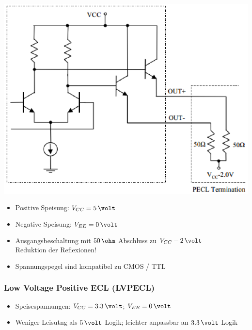 \begin{minipage}[c]{0.25\columnwidth}
    \includegraphics[width=\columnwidth]{images/PECL.png}
\end{minipage}
\hfill
\begin{minipage}[c]{0.72\columnwidth}
   \begin{itemize}
    \item Positive Speisung: $V_{CC} = 5 \, \volt$
    \item Negative Speisung: $V_{EE} = 0 \, \volt$
    \item Ausgangsbeschaltung mit $50 \, \ohm$ Abschluss zu $V_{CC} - 2 \, \volt$ \\
        \textrightarrow Reduktion der Reflexionen!
    \item Spannungspegel sind kompatibel zu CMOS / TTL
   \end{itemize}
\end{minipage}

\subsubsection{Low Voltage Positive ECL (LVPECL)}

\begin{itemize}
    \item Speisespannungen:  $V_{CC} = 3.3 \, \volt$; $V_{EE} = 0 \, \volt$
    \item Weniger Leisutng als $5 \, \volt$ Logik; leichter anpassbar an $3.3 \, \volt$ Logik
\end{itemize}


